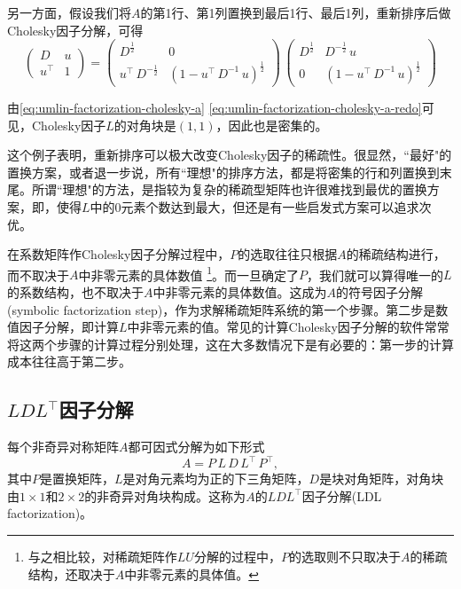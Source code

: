 另一方面，假设我们将$A$的第1行、第1列置换到最后1行、最后1列，重新排序后做Cholesky因子分解，可得
\begin{equation}
  \label{eq:umlin-factorization-cholesky-a-redo}
\begin{pmatrix}
  D & u \\
  u^{\top} & 1
\end{pmatrix}
= \begin{pmatrix}
D^{\frac{1}{2}} & 0 \\
u^{\top} \, D^{-\frac{1}{2}} & \left( 1 - u^{\top} \, D^{-1} \, u \right)^{\frac{1}{2}}
\end{pmatrix}
\,
\begin{pmatrix}
  D^{\frac{1}{2}} & D^{-\frac{1}{2}} \, u \\
  0 & \left( 1 - u^{\top} \, D^{-1} \, u \right)^{\frac{1}{2}}
\end{pmatrix}
\end{equation}

由\eqref{eq:umlin-factorization-cholesky-a} \eqref{eq:umlin-factorization-cholesky-a-redo}可见，Cholesky因子$L$的对角块是$(1,1)$，因此也是密集的。

这个例子表明，重新排序可以极大改变Cholesky因子的稀疏性。很显然，``最好"的置换方案，或者退一步说，所有``理想"的排序方法，都是将密集的行和列置换到末尾。所谓``理想"的方法，是指较为复杂的稀疏型矩阵也许很难找到最优的置换方案，即，使得$L$中的$0$元素个数达到最大，但还是有一些启发式方案可以追求次优。

在系数矩阵作Cholesky因子分解过程中，$P$的选取往往只根据$A$的稀疏结构进行，而不取决于$A$中非零元素的具体数值%
\footnote{与之相比较，对稀疏矩阵作$LU$分解的过程中，$P$的选取则不只取决于$A$的稀疏结构，还取决于$A$中非零元素的具体值。}。而一旦确定了$P$，我们就可以算得唯一的$L$的系数结构，也不取决于$A$中非零元素的具体数值。这成为$A$的符号因子分解(symbolic factorization step)，作为求解稀疏矩阵系统的第一个步骤。第二步是数值因子分解，即计算$L$中非零元素的值。常见的计算Cholesky因子分解的软件常常将这两个步骤的计算过程分别处理，这在大多数情况下是有必要的：第一步的计算成本往往高于第二步。

\subsection[LDL因子分解]{$LDL^{\top}$因子分解}
\label{sec:numlin-factorization-ldl}
每个非奇异对称矩阵$A$都可因式分解为如下形式
\begin{equation}
  \label{eq:numlin-factorization-ldl}
  A = P \, L \, D \, L^{\top} \, P^{\top},
\end{equation}
其中$P$是置换矩阵，$L$是对角元素均为正的下三角矩阵，$D$是块对角矩阵，对角块由$1 \times 1$和$2 \times 2$的非奇异对角块构成。这称为$A$的$LDL^{\top}$因子分解(LDL factorization)。

